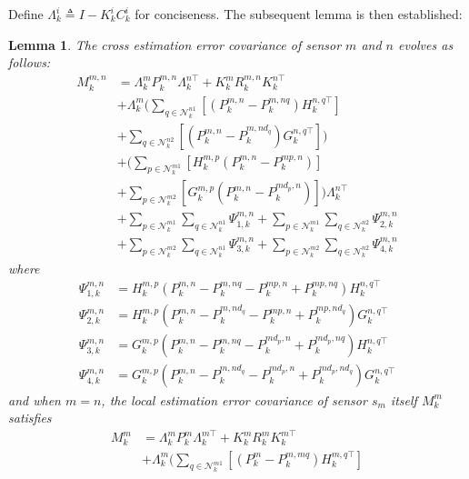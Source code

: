 \documentclass[twocolumn]{IEEEtran}
\newtheorem{lemma}{Lemma}
\begin{document}
Define $\Lambda_{k}^{i} \triangleq I - K_{k}^{i}C_{k}^{i}$ for conciseness. The subsequent lemma is then established:
\begin{lemma}
The cross estimation error covariance of sensor $m$ and $n$ evolves as follows:
\begin{equation}\label{M_ij}
\begin{split}
M_{k}^{m,n}&=\Lambda_{k}^{m}P_{k}^{m,n}\Lambda_{k}^{n\top}+K_{k}^{m}R_{k}^{m,n}K_{k}^{n\top}\\
&+\Lambda_{k}^{m}(\sum_{q\in\mathcal{N}_{k}^{n1}}[(P_{k}^{m,n}-P_{k}^{m,nq})H_{k}^{n,q\top}]\\
&+\sum_{q\in\mathcal{N}_{k}^{n2}}[(P_{k}^{m,n}-P_{k}^{m,nd_q})G_{k}^{n,q\top}])\\
\quad&+(\sum_{p\in\mathcal{N}_{k}^{m1}}[H_{k}^{m,p}(P_{k}^{m,n}-P_{k}^{mp,n})]\\
&+\sum_{p\in\mathcal{N}_{k}^{m2}}[G_{k}^{m,p}(P_{k}^{m,n}-P_{k}^{md_ p,n})])\Lambda_{k}^{n\top}\\
&+\sum_{p\in\mathcal{N}_{k}^{m1}}\sum_{q\in\mathcal{N}_{k}^{n1}}\Psi_{1,k}^{m,n}+\sum_{p\in\mathcal{N}_{k}^{m1}}\sum_{q\in\mathcal{N}_{k}^{n2}}\Psi_{2,k}^{m,n}\\
&+\sum_{p\in\mathcal{N}_{k}^{m2}}\sum_{q\in\mathcal{N}_{k}^{n1}}\Psi_{3,k}^{m,n}+\sum_{p\in\mathcal{N}_{k}^{m2}}\sum_{q\in\mathcal{N}_{k}^{n2}}\Psi_{4,k}^{m,n}
\end{split}
\end{equation}
where
\begin{equation*}
\begin{split}
\Psi_{1,k}^{m,n}&=H_{k}^{m,p}(P_{k}^{m,n}-P_{k}^{m,nq}-P_{k}^{mp,n}+P_{k}^{mp,nq})H_{k}^{n,q\top}\\
\Psi_{2,k}^{m,n}&=H_{k}^{m,p}(P_{k}^{m,n}-P_{k}^{m,nd_q}-P_{k}^{mp,n}+P_{k}^{mp,nd_q})G_{k}^{n,q\top}\\
\Psi_{3,k}^{m,n}&=G_{k}^{m,p}(P_{k}^{m,n}-P_{k}^{m,nq}-P_{k}^{md_p,n}+P_{k}^{md_p,nq})H_{k}^{n,q\top}\\
\Psi_{4,k}^{m,n}&=G_{k}^{m,p}(P_{k}^{m,n}-P_{k}^{m,nd_q}-P_{k}^{md_p,n}+P_{k}^{md_p,nd_q})G_{k}^{n,q\top}
\end{split}
\end{equation*}
and when $m=n$, the local estimation error covariance of sensor $s_{m}$ itself $M_{k}^{m}$ satisfies
\begin{equation*}
\begin{split}
M_{k}^{m}&=\Lambda_{k}^{m}P_{k}^{m}\Lambda_{k}^{m\top}+K_{k}^{m}R_{k}^{m}K_{k}^{m\top}\\
\quad&+\Lambda_{k}^{m}(\sum_{q\in\mathcal{N}_{k}^{m1}}[(P_{k}^{m}-P_{k}^{m,mq})H_{k}^{m,q\top}]\\

\end{split}
\end{equation*}
\end{lemma}
\end{document}

